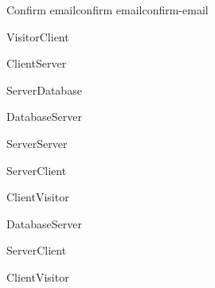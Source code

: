 \begin{sdfig}{Confirm email}{confirm email}{confirm-email}

  \begin{umlcall}[op={Confirm}]{Visitor}{Client}
    \begin{umlcall}[op={Confirm}]{Client}{Server}
      \begin{umlcall}[op={Has OTP}]{Server}{Database}
        \begin{umlfragment}[type=alt, label=true]
          \begin{umlcall}[type=return,op={Yes}]{Database}{Server}
            \begin{umlcall}[op={Add cookies}]{Server}{Server}
            \end{umlcall}
            \begin{umlcall}[type=return,op={Done}]{Server}{Client}
              \begin{umlcall}[type=return,op={Done}]{Client}{Visitor}
              \end{umlcall}
            \end{umlcall}
          \end{umlcall}
          \umlfpart[else]
          \begin{umlcall}[type=return,op={No}]{Database}{Server}
            \begin{umlcall}[type=return,op={Error}]{Server}{Client}
              \begin{umlcall}[type=return,op={Error}]{Client}{Visitor}
              \end{umlcall}
            \end{umlcall}
          \end{umlcall}
        \end{umlfragment}
      \end{umlcall}
    \end{umlcall}
  \end{umlcall}
\end{sdfig}


